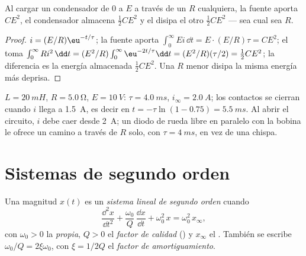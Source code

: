 \begin{proposition}\label{prop:b1:transient-regimes:rcenergy}
Al cargar un condensador de $0$ a $E$ a través de un  $R$
cualquiera, la fuente aporta $CE^2$, el condensador almacena
$\tfrac12 CE^2$ y el  disipa el otro $\tfrac12 CE^2$ --- sea cual sea $R$.
\end{proposition}

\begin{proof}
$i = (E/R)\eu^{-t/\tau}$; la fuente aporta $\int_0^\infty Ei\,\dd t
= E \cdot (E/R)\tau = CE^2$; el  toma $\int_0^\infty Ri^2\,\dd t
= (E^2/R)\int_0^\infty \eu^{-2t/\tau}\dd t = (E^2/R)(\tau/2) = \tfrac12 CE^2$;
la diferencia es la energía almacenada $\tfrac12 CE^2$. Una $R$ menor
disipa la misma energía más deprisa.
\end{proof}

\begin{example}\label{ex:b1:transient-regimes:relay}
$L = \qty{20}{mH}$, $R = \qty{5.0}{\ohm}$, $E = \qty{10}{V}$: $\tau =
\qty{4.0}{ms}$, $i_\infty = \qty{2.0}{A}$; los contactos se cierran cuando
$i$ llega a \qty{1.5}{A}, es decir en $t = -\tau\ln(1 - 0.75) =
\qty{5.5}{ms}$. Al abrir el circuito, $i$ debe caer desde \qty{2}{A}; un
diodo de rueda libre en paralelo con la bobina le ofrece un camino a
través de $R$ solo, con $\tau = \qty{4}{ms}$, en vez de una chispa.
\end{example}

\section{Sistemas de segundo orden}

\begin{definition}\label{def:b1:transient-regimes:secondorder}
Una magnitud $x(t)$ es un \emph{sistema lineal de segundo orden} cuando
\[
\frac{\dd^2 x}{\dd t^2} + \frac{\omega_0}{Q}\,\frac{\dd x}{\dd t} + \omega_0^2\,x
= \omega_0^2\,x_\infty ,
\]
con $\omega_0 > 0$ la \emph{ propia}, $Q > 0$ el
\emph{factor de calidad} () y $x_\infty$ el . También se escribe $\omega_0/Q = 2\xi\omega_0$, con
$\xi = 1/2Q$ el \emph{factor de amortiguamiento}.
\end{definition}

